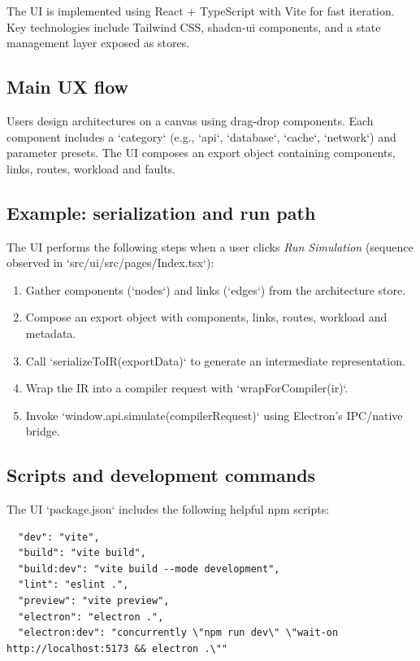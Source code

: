 \documentclass[11pt,a4paper]{article}
\begin{document}
The UI is implemented using React + TypeScript with Vite for fast iteration. Key technologies include Tailwind CSS, shadcn-ui components, and a state management layer exposed as stores.

\subsection{Main UX flow}

Users design architectures on a canvas using drag-drop components. Each component includes a `category` (e.g., `api`, `database`, `cache`, `network`) and parameter presets. The UI composes an export object containing components, links, routes, workload and faults.

\subsection{Example: serialization and run path}
The UI performs the following steps when a user clicks \textit{Run Simulation} (sequence observed in `src/ui/src/pages/Index.tsx`):

\begin{enumerate}
  \item Gather components (`nodes`) and links (`edges`) from the architecture store.
  \item Compose an export object with components, links, routes, workload and metadata.
  \item Call `serializeToIR(exportData)` to generate an intermediate representation.
  \item Wrap the IR into a compiler request with `wrapForCompiler(ir)`.
  \item Invoke `window.api.simulate(compilerRequest)` using Electron's IPC/native bridge.
\end{enumerate}

\subsection{Scripts and development commands}
The UI `package.json` includes the following helpful npm scripts:
\begin{verbatim}
  "dev": "vite",
  "build": "vite build",
  "build:dev": "vite build --mode development",
  "lint": "eslint .",
  "preview": "vite preview",
  "electron": "electron .",
  "electron:dev": "concurrently \"npm run dev\" \"wait-on http://localhost:5173 && electron .\""
\end{verbatim}
\end{document}

